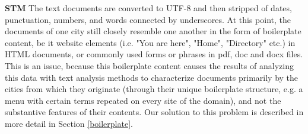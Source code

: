 \documentclass[11pt]{article}
\begin{document}
{\bf STM}
The text documents are converted to UTF-8 and then stripped of dates, punctuation, numbers, and words connected by underscores. At this point, the documents of one city still closely resemble one another in the form of boilerplate content, be it website elements (i.e. "You are here", "Home", "Directory" etc.) in HTML documents, or commonly used forms or phrases in pdf, doc and docx files. This is an issue, because this boilerplate content causes the results of analyzing this data with text analysis methods to characterize documents primarily by the cities from which they originate (through their unique boilerplate structure, e.g. a menu with certain terms repeated on every site of the domain), and not the substantive features of their contents. Our solution to this problem is described in more detail in Section \ref{boilerplate}.
\end{document}
